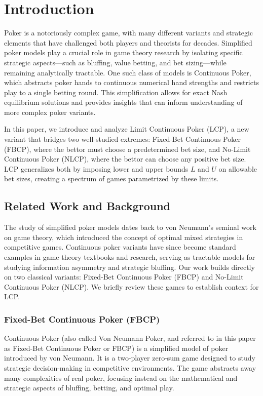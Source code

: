 \documentclass[../../main/main.tex]{subfiles}
\begin{document}
\section{Introduction}

Poker is a notoriously complex game, with many different variants and strategic elements that have challenged both players and theorists for decades. Simplified poker models play a crucial role in game theory research by isolating specific strategic aspects---such as bluffing, value betting, and bet sizing---while remaining analytically tractable. One such class of models is Continuous Poker, which abstracts poker hands to continuous numerical hand strengths and restricts play to a single betting round. This simplification allows for exact Nash equilibrium solutions and provides insights that can inform understanding of more complex poker variants.

In this paper, we introduce and analyze Limit Continuous Poker (LCP), a new variant that bridges two well-studied extremes: Fixed-Bet Continuous Poker (FBCP), where the bettor must choose a predetermined bet size, and No-Limit Continuous Poker (NLCP), where the bettor can choose any positive bet size. LCP generalizes both by imposing lower and upper bounds $L$ and $U$ on allowable bet sizes, creating a spectrum of games parametrized by these limits.

\subsection{Related Work and Background}

The study of simplified poker models dates back to von Neumann's seminal work on game theory, which introduced the concept of optimal mixed strategies in competitive games. Continuous poker variants have since become standard examples in game theory textbooks and research, serving as tractable models for studying information asymmetry and strategic bluffing. Our work builds directly on two classical variants: Fixed-Bet Continuous Poker (FBCP) and No-Limit Continuous Poker (NLCP). We briefly review these games to establish context for LCP.

\subsubsection{Fixed-Bet Continuous Poker (FBCP)}

Continuous Poker (also called Von Neumann Poker, and referred to in this paper as Fixed-Bet Continuous Poker or FBCP) is a simplified model of poker introduced by von Neumann. It is a two-player zero-sum game designed to study strategic decision-making in competitive environments. The game abstracts away many complexities of real poker, focusing instead on the mathematical and strategic aspects of bluffing, betting, and optimal play.
\end{document}
